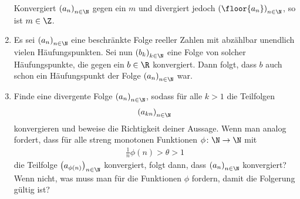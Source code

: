 \begin{prob}
\begin{enumerate}[label=(\alph*)]
    Konvergiert $\left( a_n \right)_{n \in \N}$ gegen ein $m$ und divergiert
    jedoch $\left( \floor{a_n} \right)_{n \in \N}$, so ist $m \in \Z$.
  \item Es sei $\left( a_n \right)_{n \in \N}$ eine beschränkte Folge reeller
    Zahlen mit abzählbar unendlich vielen Häufungspunkten. Sei nun
    $\left( b_k \right)_{k \in \N}$ eine Folge von solcher Häufungspunkte, die
    gegen ein $b \in \R$ konvergiert. Dann folgt, dass $b$ auch schon ein
    Häufungspunkt der Folge $\left( a_n \right)_{n \in \N}$ war.
  \item Finde eine divergente Folge $\left( a_n \right)_{n \in \N}$, sodass für
    alle $k > 1$ die Teilfolgen
    \begin{equation*}
      \begin{split}
        \left( a_{kn} \right)_{n \in \N}
      \end{split}
    \end{equation*}
    konvergieren und beweise die Richtigkeit deiner Aussage. Wenn man analog
    fordert, dass für alle streng monotonen Funktionen $\phi \colon \N \to \N$
    mit
    \begin{equation*}
      \begin{split}
        \frac{1}{n} \phi(n) > \theta > 1
      \end{split}
    \end{equation*}
    die Teilfolge $\left( a_{\phi(n)} \right)_{n \in \N}$ konvergiert, folgt
    dann, dass $\left( a_n \right)_{n \in \N}$ konvergiert? Wenn nicht, was muss
    man für die Funktionen $\phi$ fordern, damit die Folgerung gültig ist?
  \end{enumerate}
\end{prob}

